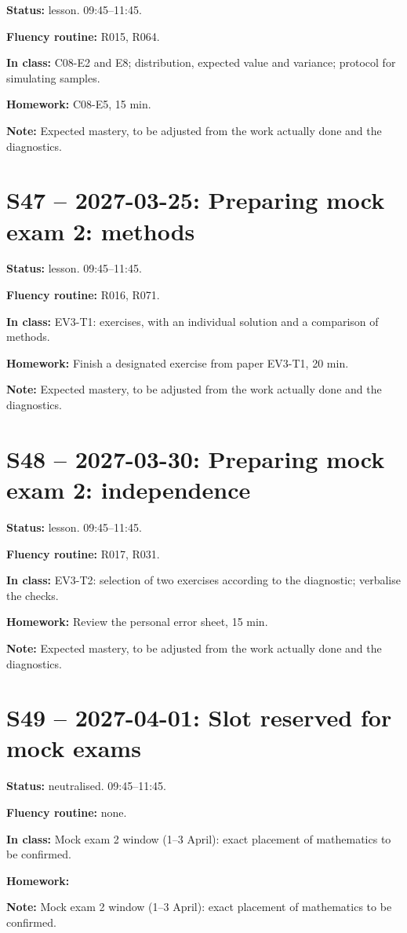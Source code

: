 \textbf{Status:} lesson. 09:45–11:45.\par\textbf{Fluency routine:} R015, R064.\par\textbf{In class:} C08-E2 and E8; distribution, expected value and variance; protocol for simulating samples.\par\textbf{Homework:} C08-E5, 15 min.\par\textbf{Note:} Expected mastery, to be adjusted from the work actually done and the diagnostics.
\section*{S47 -- 2027-03-25: Preparing mock exam 2: methods}
\textbf{Status:} lesson. 09:45–11:45.\par\textbf{Fluency routine:} R016, R071.\par\textbf{In class:} EV3-T1: exercises, with an individual solution and a comparison of methods.\par\textbf{Homework:} Finish a designated exercise from paper EV3-T1, 20 min.\par\textbf{Note:} Expected mastery, to be adjusted from the work actually done and the diagnostics.
\section*{S48 -- 2027-03-30: Preparing mock exam 2: independence}
\textbf{Status:} lesson. 09:45–11:45.\par\textbf{Fluency routine:} R017, R031.\par\textbf{In class:} EV3-T2: selection of two exercises according to the diagnostic; verbalise the checks.\par\textbf{Homework:} Review the personal error sheet, 15 min.\par\textbf{Note:} Expected mastery, to be adjusted from the work actually done and the diagnostics.
\section*{S49 -- 2027-04-01: Slot reserved for mock exams}
\textbf{Status:} neutralised. 09:45–11:45.\par\textbf{Fluency routine:} none.\par\textbf{In class:} Mock exam 2 window (1–3 April): exact placement of mathematics to be confirmed.\par\textbf{Homework:} \par\textbf{Note:} Mock exam 2 window (1–3 April): exact placement of mathematics to be confirmed.

